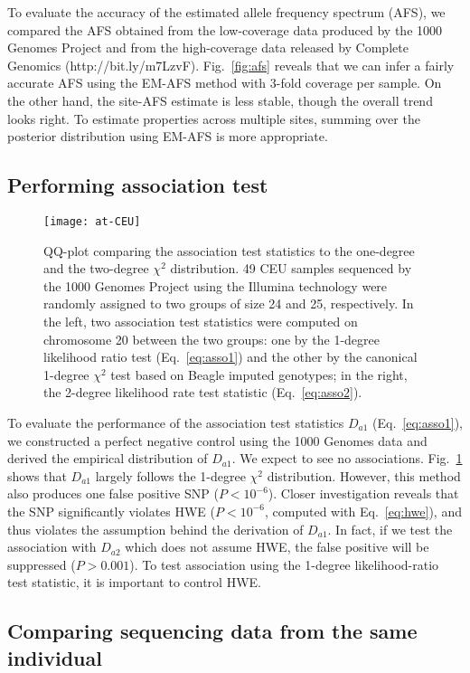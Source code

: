 \documentclass{bioinfo}
\begin{document}
To evaluate the accuracy of the estimated allele frequency spectrum (AFS), we
compared the AFS obtained from the low-coverage data produced by the 1000
Genomes Project and from the high-coverage data released by Complete Genomics (http://bit.ly/m7LzvF).
Fig.~\ref{fig:afs} reveals that we can infer a fairly accurate AFS using the
EM-AFS method with 3-fold coverage per sample. On the other hand, the site-AFS
estimate is less stable, though the overall trend looks right. To estimate
properties across multiple sites, summing over the posterior distribution using EM-AFS is
more appropriate.

\subsection{Performing association test}
\begin{figure}[tb]
\centering
\texttt{[image: at-CEU]}
\caption{QQ-plot comparing the association test statistics to the one-degree
and the two-degree $\chi^2$ distribution.
49 CEU samples sequenced by the 1000 Genomes Project using the Illumina
technology were randomly assigned to two groups of size 24 and 25,
respectively.  In the left, two association test statistics were computed on chromosome 20
between the two groups: one by the 1-degree likelihood ratio test (Eq.~\ref{eq:asso1}) and the other
by the canonical 1-degree $\chi^2$ test based on Beagle imputed
genotypes; in the right, the 2-degree likelihood rate test statistic (Eq.~\ref{eq:asso2}).}\label{fig:at}
\end{figure}

To evaluate the performance of the association test statistics $D_{a1}$
(Eq.~\ref{eq:asso1}), we constructed a perfect negative control using the
1000 Genomes data and derived the empirical distribution of $D_{a1}$.
We expect to see no associations.
Fig.~\ref{fig:at} shows that $D_{a1}$ largely follows the 1-degree $\chi^2$
distribution.  However, this method also produces one false positive SNP
($P<10^{-6}$). Closer investigation reveals that the SNP significantly violates
HWE ($P<10^{-6}$, computed with Eq.~\eqref{eq:hwe}), and thus violates the
assumption behind the derivation of $D_{a1}$.  In fact, if we test the
association with $D_{a2}$ which does not assume HWE, the false positive will be
suppressed ($P>0.001$). To test association using the 1-degree likelihood-ratio
test statistic, it is important to control HWE.

\subsection{Comparing sequencing data from the same individual}
\end{document}
